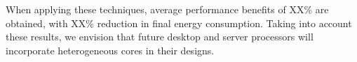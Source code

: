 When applying these techniques, average performance benefits of XX\% are obtained, with XX\% reduction in final energy consumption. Taking into account these results, we envision that future desktop and server processors will incorporate heterogeneous cores in their designs.



\fi
